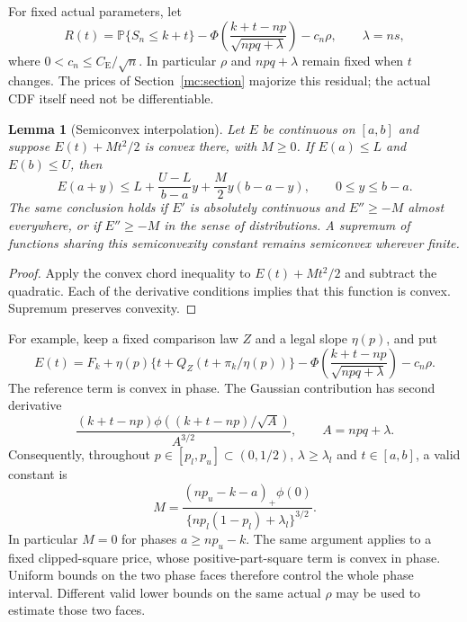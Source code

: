 \documentclass[aop,preprint]{imsart}
\newtheorem{lemma}[theorem]{Lemma}
\theoremstyle{definition}
\newcommand{\CE}{C_{\mathrm E}}
\newcommand{\PP}{\mathbb P}
\numberwithin{equation}{section}
\begin{document}
For fixed actual parameters, let
\begin{equation}\label{pp:actual-residual}
 R(t)=\PP\{S_n\le k+t\}
 -\Phi\left(\frac{k+t-np}{\sqrt{npq+\lambda}}\right)-c_n\rho,
 \qquad \lambda=ns,
\end{equation}
where $0<c_n\le\CE/\sqrt n$. In particular $\rho$ and
$npq+\lambda$ remain fixed when $t$ changes.
The prices of Section~\ref{mc:section} majorize this residual;
the actual CDF itself need not be differentiable.

\begin{lemma}[Semiconvex interpolation]\label{pp:chord}
Let $E$ be continuous on $[a,b]$ and suppose
$E(t)+Mt^2/2$ is convex there, with $M\ge0$.
If $E(a)\le L$ and $E(b)\le U$, then
\begin{equation}\label{pp:chord-bound}
 E(a+y)\le L+\frac{U-L}{b-a}y
                   +\frac M2y(b-a-y),\qquad 0\le y\le b-a.
\end{equation}
The same conclusion holds if $E'$ is absolutely continuous and
$E''\ge-M$ almost everywhere, or if $E''\ge-M$ in the sense of
distributions. A supremum of functions sharing this semiconvexity
constant remains semiconvex wherever finite.
\end{lemma}
\begin{proof}
Apply the convex chord inequality to $E(t)+Mt^2/2$ and subtract
the quadratic. Each of the derivative conditions implies that
this function is convex. Supremum preserves convexity.
\end{proof}

For example, keep a fixed comparison law $Z$ and a legal slope
$\eta(p)$, and put
\[
 E(t)=F_k+\eta(p)\{t+Q_Z(t+\pi_k/\eta(p))\}
 -\Phi\left(\frac{k+t-np}{\sqrt{npq+\lambda}}\right)-c_n\rho.
\]
The reference term is convex in phase. The Gaussian contribution
has second derivative
\[
 \frac{(k+t-np)\phi((k+t-np)/\sqrt A)}{A^{3/2}},
 \qquad A=npq+\lambda.
\]
Consequently, throughout $p\in[p_l,p_u]\subset(0,1/2)$,
$\lambda\ge\lambda_l$ and $t\in[a,b]$, a valid constant is
\begin{equation}\label{pp:gaussian-curvature}
 M=\frac{(np_u-k-a)_+\phi(0)}
          {\{np_l(1-p_l)+\lambda_l\}^{3/2}}.
\end{equation}
In particular $M=0$ for phases $a\ge np_u-k$.
The same argument applies to a fixed clipped-square price,
whose positive-part-square term is convex in phase.
Uniform bounds on the two phase faces therefore control the whole
phase interval. Different valid lower bounds on the same actual
$\rho$ may be used to estimate those two faces.
\end{document}
